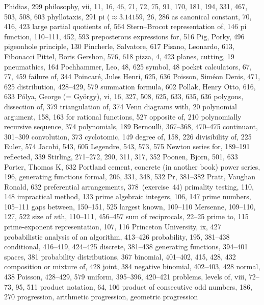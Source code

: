 Phidias, 299
philosophy, vii, 11, 16, 46, 71, 72, 75, 91, 170, 181, 194, 331, 467, 503, %
 508, 603
phyllotaxis, 291
pi ($\approx3.14159$, 26, 286
\sub as canonical constant, 70, 416, 423
\sub large partial quotients of, 564
\sub Stern--Brocot representation of, 146
pi function, 110--111, 452, 593
\sub preposterous expressions for, 516
Pig, Porky, 496
pigeonhole principle, 130
Pincherle, Salvatore, 617
Pisano, Leonardo, 613, \see Fibonacci
Pittel, Boris Gershon, 576, 618
pizza, 4, 423
planes, cutting, 19
pneumathics, 164
Pochhammer, Leo, 48, 625
\sub symbol, 48
pocket calculators, 67, 77, 459
\sub failure of, 344
Poincar\'e, Jules Henri, 625, 636
Poisson, Sim\'eon Denis, 471, 625
\sub distribution, 428--429, 579
\sub summation formula, 602
Pollak, Henry Otto, 616, 633
P\'olya, George (= Gy\"orgy), vi, 16, 327, 508, 625, 633, 635, 636
polygons,
\sub dissection of, 379
\sub triangulation of, 374
\sub Venn diagrams with, 20
polynomial argument, 158, 163
\sub for rational functions, 527
\sub opposite of, 210
polynomially recursive sequence, 374
polynomials, 189
\sub Bernoulli, 367--368, 470--475
\sub continuant, 301--309
\sub convolution, 373
\sub cyclotomic, 149
\sub degree of, 158, 226
\sub divisibility of, 225
\sub Euler, 574
\sub Jacobi, 543, 605
\sub Legendre, 543, 573, 575
\sub Newton series for, 189--191
\sub reflected, 339
\sub Stirling, 271--272, 290, 311, 317, 352
Poonen, Bjorn, 501, 633
Porter, Thomas K, 632
Portland cement, \see concrete (in another book)
power series, 196, \see generating functions
\sub formal, 206, 331, 348, 532
Pr, 381--382
Pratt, Vaughan Ronald, 632
preferential arrangements, 378~(exercise~44)
primality testing, 110, 148
\sub impractical method, 133
prime algebraic integers, 106, 147
prime numbers, 105--111
\sub gaps between, 150--151, 525
\sub largest known, 109--110
\sub Mersenne, 109--110, 127, 522
\sub size of $n$th, 110--111, 456--457
\sub sum of reciprocals, 22--25
prime to, 115
prime-exponent representation, 107, 116
Princeton University, ix, 427
probabilistic analysis of an algorithm, 413--426
probability, 195, 381--438
\sub conditional, 416--419, 424--425
\sub discrete, 381--438
\sub generating functions, 394--401
\sub spaces, 381
probability distributions, 367
\sub binomial, 401--402, 415, 428, 432
\sub composition or mixture of, 428
\sub joint, 384
\sub negative binomial, 402--403, 428
\sub normal, 438
\sub Poisson, 428--429, 579
\sub uniform, 395--396, 420--421
problems, levels of, viii, 72--73, 95, 511
product notation, 64, 106
product of consecutive odd numbers, 186, 270
progression, \see arithmetic progression, geometric progression
